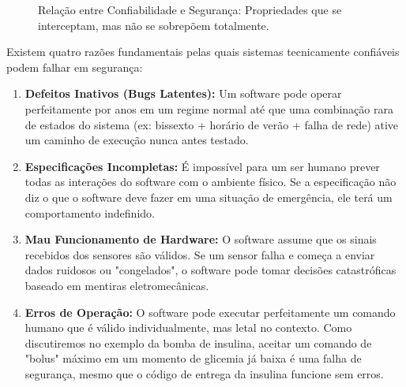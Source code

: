 \documentclass[12pt,a4paper,twoside]{report}
\begin{document}
\begin{figure}[h]
    \centering
    \caption{Relação entre Confiabilidade e Segurança: Propriedades que se interceptam, mas não se sobrepõem totalmente.}
\end{figure}

Existem quatro razões fundamentais pelas quais sistemas tecnicamente confiáveis podem falhar em segurança:

\begin{enumerate}
    \item \textbf{Defeitos Inativos (Bugs Latentes):} Um software pode operar perfeitamente por anos em um regime normal até que uma combinação rara de estados do sistema (ex: bissexto + horário de verão + falha de rede) ative um caminho de execução nunca antes testado.
    \item \textbf{Especificações Incompletas:} É impossível para um ser humano prever todas as interações do software com o ambiente físico. Se a especificação não diz o que o software deve fazer em uma situação de emergência, ele terá um comportamento indefinido.
    \item \textbf{Mau Funcionamento de Hardware:} O software assume que os sinais recebidos dos sensores são válidos. Se um sensor falha e começa a enviar dados ruidosos ou "congelados", o software pode tomar decisões catastróficas baseado em mentiras eletromecânicas.
    \item \textbf{Erros de Operação:} O software pode executar perfeitamente um comando humano que é válido individualmente, mas letal no contexto. Como discutiremos no exemplo da bomba de insulina, aceitar um comando de "bolus" máximo em um momento de glicemia já baixa é uma falha de segurança, mesmo que o código de entrega da insulina funcione sem erros.
\end{enumerate}
\end{document}
